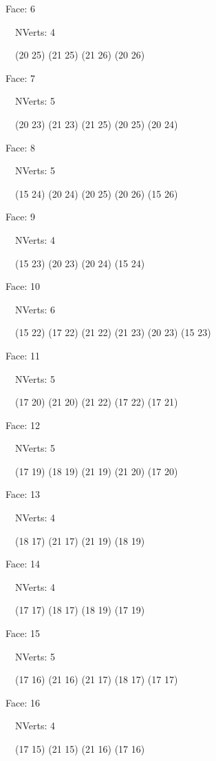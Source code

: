 \documentclass{article}
\begin{document}
{\footnotesize 

Face: 6

\   \    NVerts: 4

 \   \   (20 25) (21 25) (21 26) (20 26)}

{\footnotesize 

Face: 7

\   \    NVerts: 5

 \   \   (20 23) (21 23) (21 25) (20 25) (20 24)}

{\footnotesize 

Face: 8

\   \    NVerts: 5

 \   \   (15 24) (20 24) (20 25) (20 26) (15 26)}

{\footnotesize 

Face: 9

\   \    NVerts: 4

 \   \   (15 23) (20 23) (20 24) (15 24)}

{\footnotesize 

Face: 10

\   \    NVerts: 6

 \   \   (15 22) (17 22) (21 22) (21 23) (20 23) (15 23)}

{\footnotesize 

Face: 11

\   \    NVerts: 5

 \   \   (17 20) (21 20) (21 22) (17 22) (17 21)}

{\footnotesize 

Face: 12

\   \    NVerts: 5

 \   \   (17 19) (18 19) (21 19) (21 20) (17 20)}

{\footnotesize 

Face: 13

\   \    NVerts: 4

 \   \   (18 17) (21 17) (21 19) (18 19)}

{\footnotesize 

Face: 14

\   \    NVerts: 4

 \   \   (17 17) (18 17) (18 19) (17 19)}

{\footnotesize 

Face: 15

\   \    NVerts: 5

 \   \   (17 16) (21 16) (21 17) (18 17) (17 17)}

{\footnotesize 

Face: 16

\   \    NVerts: 4

 \   \   (17 15) (21 15) (21 16) (17 16)}
\end{document}
